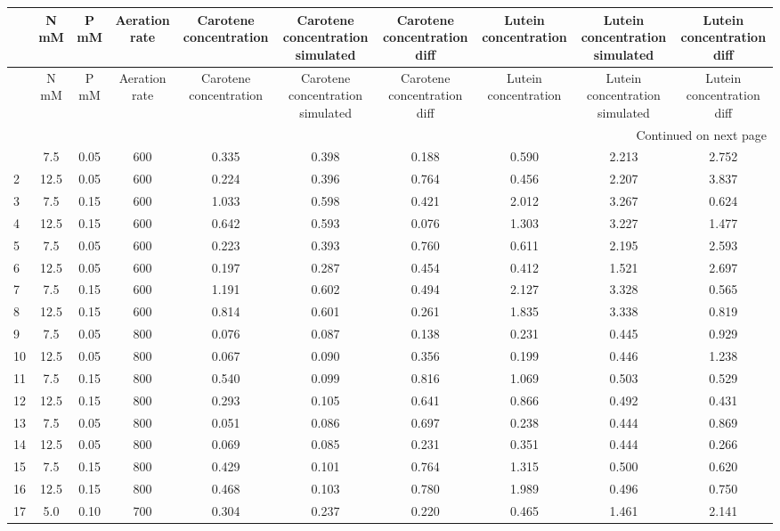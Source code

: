 \begin{longtable}{lccccccccc}
\toprule
 & N mM & P mM & Aeration rate & Carotene concentration & Carotene concentration simulated & Carotene concentration diff & Lutein concentration & Lutein concentration simulated & Lutein concentration diff \\
\midrule
\endfirsthead
\toprule
 & N mM & P mM & Aeration rate & Carotene concentration & Carotene concentration simulated & Carotene concentration diff & Lutein concentration & Lutein concentration simulated & Lutein concentration diff \\
\midrule
\endhead
\midrule
\multicolumn{10}{r}{Continued on next page} \\
\midrule
\endfoot
\bottomrule
\endlastfoot
1 & 7.5 & 0.05 & 600 & 0.335 & 0.398 & 0.188 & 0.590 & 2.213 & 2.752 \\
2 & 12.5 & 0.05 & 600 & 0.224 & 0.396 & 0.764 & 0.456 & 2.207 & 3.837 \\
3 & 7.5 & 0.15 & 600 & 1.033 & 0.598 & 0.421 & 2.012 & 3.267 & 0.624 \\
4 & 12.5 & 0.15 & 600 & 0.642 & 0.593 & 0.076 & 1.303 & 3.227 & 1.477 \\
5 & 7.5 & 0.05 & 600 & 0.223 & 0.393 & 0.760 & 0.611 & 2.195 & 2.593 \\
6 & 12.5 & 0.05 & 600 & 0.197 & 0.287 & 0.454 & 0.412 & 1.521 & 2.697 \\
7 & 7.5 & 0.15 & 600 & 1.191 & 0.602 & 0.494 & 2.127 & 3.328 & 0.565 \\
8 & 12.5 & 0.15 & 600 & 0.814 & 0.601 & 0.261 & 1.835 & 3.338 & 0.819 \\
9 & 7.5 & 0.05 & 800 & 0.076 & 0.087 & 0.138 & 0.231 & 0.445 & 0.929 \\
10 & 12.5 & 0.05 & 800 & 0.067 & 0.090 & 0.356 & 0.199 & 0.446 & 1.238 \\
11 & 7.5 & 0.15 & 800 & 0.540 & 0.099 & 0.816 & 1.069 & 0.503 & 0.529 \\
12 & 12.5 & 0.15 & 800 & 0.293 & 0.105 & 0.641 & 0.866 & 0.492 & 0.431 \\
13 & 7.5 & 0.05 & 800 & 0.051 & 0.086 & 0.697 & 0.238 & 0.444 & 0.869 \\
14 & 12.5 & 0.05 & 800 & 0.069 & 0.085 & 0.231 & 0.351 & 0.444 & 0.266 \\
15 & 7.5 & 0.15 & 800 & 0.429 & 0.101 & 0.764 & 1.315 & 0.500 & 0.620 \\
16 & 12.5 & 0.15 & 800 & 0.468 & 0.103 & 0.780 & 1.989 & 0.496 & 0.750 \\
17 & 5.0 & 0.10 & 700 & 0.304 & 0.237 & 0.220 & 0.465 & 1.461 & 2.141 \\

\end{longtable}
